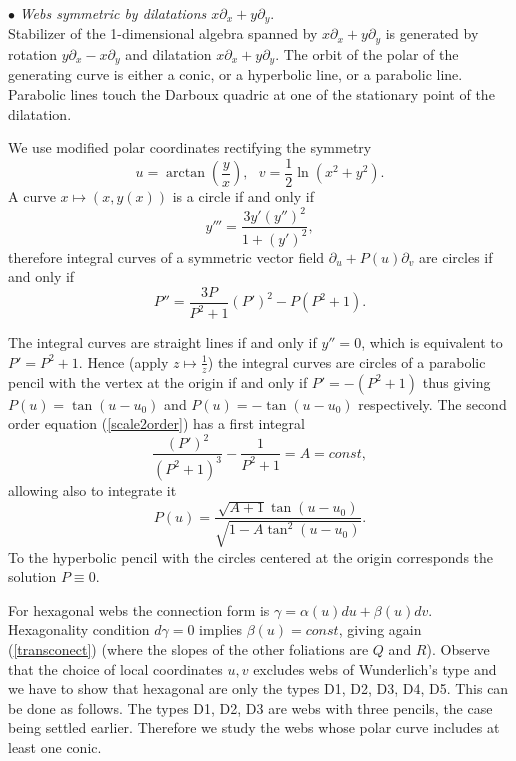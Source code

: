 \documentclass[11pt,a4paper]{article}
\begin{document}
$\bullet${ \it Webs symmetric by dilatations $x\partial_x+y\partial_y$}.\\  
Stabilizer of the 1-dimensional algebra spanned by $x\partial_x+y\partial_y$ is generated by rotation $y\partial_x-x\partial_y$ and dilatation  $x\partial_x+y\partial_y$. The orbit of the polar of the generating curve is either a conic, or a hyperbolic line, or a parabolic line. Parabolic lines touch the Darboux quadric at one of the stationary point of the dilatation. 



We use modified polar coordinates rectifying the symmetry 
\begin{equation}\label{polar}
u = \arctan\left(\frac{y}{x}\right), \ \ \ v= \frac{1}{2} \ln(x^2 + y^2). 
\end{equation}
A curve $x\mapsto (x,y(x))$ is a circle if and only if 
$$
y'''=\frac{3y'(y'')^2}{1+(y')^2},
$$
therefore integral curves of a symmetric vector field $\partial_u+P(u)\partial_v$ are circles 
if and only if 
\begin{equation}\label{scale2order}
P''=\frac{3P}{P^2 + 1}(P')^2 - P(P^2 + 1). 
\end{equation}

The integral curves are straight lines if and only if $y''=0$, which is equivalent to 
$P'=P^2+1$. Hence (apply $z\mapsto \frac{1}{z}$) the  integral curves are circles of a parabolic pencil with the vertex at the origin if and only if $P'=-(P^2+1)$  thus giving $P(u)=\tan(u-u_0)$ and  $P(u)=-\tan(u-u_0)$ respectively.  
The second order equation (\ref{scale2order}) has a first integral
$$
\frac{(P')^2}{(P^2 + 1)^3} - \frac{1}{P^2 + 1} =A=const, 
$$
allowing also to integrate it 
\begin{equation}\label{generalscale}
P(u)=\frac{\sqrt{A + 1}\tan(u - u_0)}{\sqrt{1 - A\tan^2(u - u_0)}}. 
\end{equation}
To the hyperbolic pencil with the circles centered at the origin  corresponds the solution $P\equiv 0$. 


 For hexagonal webs the connection form is
$\gamma=\alpha(u)du+\beta(u)dv$. Hexagonality condition $d\gamma=0$ implies $\beta(u)=const$, giving again (\ref{transconect}) (where the slopes of the other foliations are $Q$ and $R$).  
Observe that the choice of local coordinates $u,v$ excludes webs of Wunderlich's type and  we have to show that hexagonal are  only the  types D1, D2, D3, D4, D5. 
This can be done as follows. The types D1, D2, D3 are webs with three pencils, the case being settled earlier. Therefore we study the webs whose polar curve includes at least one conic.
\end{document}
